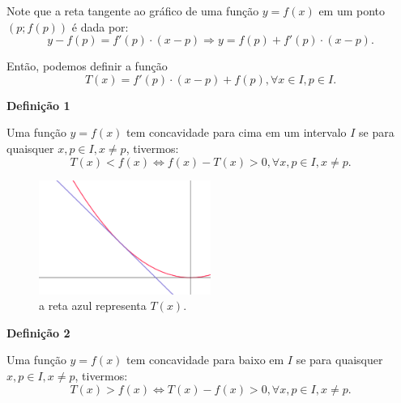 \documentclass{article}
\begin{document}
{\begin{newpage}
\begin{newpage}
\vspace{0.3cm}
\par Note que a reta tangente ao gráfico de uma função $y=f(x)$ em um ponto $(p;f(p))$ é dada por:
\begin{equation*} y - f(p) = f'(p)\cdot (x - p) \Rightarrow y = f(p) + f'(p)\cdot (x - p) .\end{equation*}
\par Então, podemos definir a função
\begin{equation*} T(x) = f'(p)\cdot (x - p) + f(p), \forall x\in I, p\in I .\end{equation*}
\end{newpage}
\vspace{0.3cm}
\begin{flushleft}
\textbf{Definição 1}
\end{flushleft}
\hspace{12pt} Uma função $y=f(x)$ tem concavidade para cima em um intervalo $I$ se para quaisquer $x,p\in I, x\neq p$, tivermos:
\begin{equation*} T(x)<f(x) \Leftrightarrow f(x) - T(x)>0, \forall x,p\in I, x\neq p .\end{equation*}
  
\begin{figure}[htbp]
\begin{center}
\includegraphics[width=0.5\textwidth, angle=0]{Grafico6.png}
\end{center}
\caption{a reta azul representa $T(x)$.}
\end{figure}

\par
\vspace{0.3cm}
\begin{flushleft}
\textbf{Definição 2}
\end{flushleft}
\hspace{12pt} Uma função $y=f(x)$ tem concavidade para baixo em $I$ se para quaisquer $x,p\in I, x\neq p$, tivermos:
\begin{equation*} T(x) > f(x) \Leftrightarrow T(x) - f(x)>0, \forall x,p \in I, x\neq p. \end{equation*}


\end{newpage}}
\end{document}
